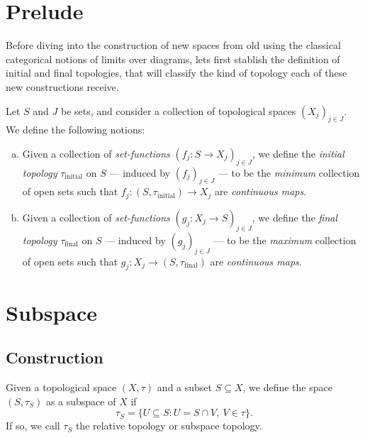 \section{Prelude}

Before diving into the construction of new spaces from old using the classical
categorical notions of limits over diagrams, lets first stablish the definition
of initial and final topologies, that will classify the kind of topology each of
these new constructions receive.

\begin{definition}
    \label{def:initial-final-topology}
    Let \(S\) and \(J\) be sets, and consider a collection of topological spaces
    \((X_j)_{j \in J}\). We define the following notions:
    \begin{enumerate}[(a)]\setlength\itemsep{0em}
        \item Given a collection of \emph{set-functions} \((f_j: S \to X_j)_{j \in J}\),
              we define the \emph{initial topology} \(\tau_{\text{initial}}\) on \(S\) ---
              induced by \((f_j)_{j \in J}\) --- to be the \emph{minimum} collection of open
              sets such that \(f_j: (S, \tau_{\text{initial}}) \to X_j\) are
              \emph{continuous maps}.
        \item Given a collection of \emph{set-functions} \((g_j: X_j \to S)_{j \in J}\),
              we define the \emph{final topology} \(\tau_{\text{final}}\) on \(S\) ---
              induced by \((g_j)_{j \in J}\) --- to be the \emph{maximum} collection of open
              sets such that \(g_j: X_j \to (S, \tau_{\text{final}})\) are \emph{continuous
                  maps}.
    \end{enumerate}
\end{definition}

\section{Subspace}

\subsection{Construction}

\begin{definition}
    \label{def: subspace topology}
    Given a topological space \((X, \tau)\) and a subset \(S \subseteq X\),
    we define the space \((S, \tau_S)\) as a subspace of \(X\) if
    \[
        \tau_S = \{U \subseteq S \colon U = S \cap V,\ V \in \tau\}.
    \]
    If so, we call \(\tau_S\) the relative topology or subspace topology.
\end{definition}

